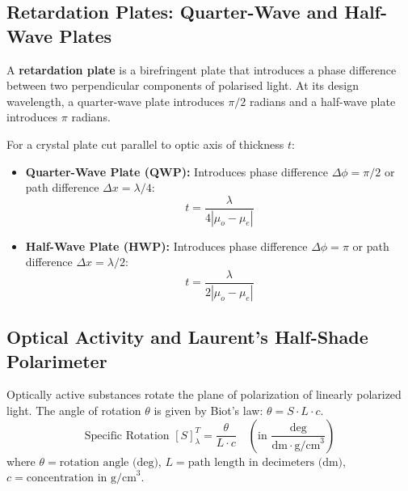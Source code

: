 \documentclass[12pt,a4paper]{article}
\begin{document}
\subsection{Retardation Plates: Quarter-Wave and Half-Wave Plates}

\begin{tcolorbox}[defbox, title={Retardation Plate}]
A \textbf{retardation plate} is a birefringent plate that introduces a phase difference between two perpendicular components of polarised light. At its design wavelength, a quarter-wave plate introduces $\pi/2$ radians and a half-wave plate introduces $\pi$ radians.
\end{tcolorbox}

\begin{tcolorbox}[formulabox, title={\textbf{Retardation Plate Thickness Equations}}]
For a crystal plate cut parallel to optic axis of thickness $t$:
\begin{itemize}[leftmargin=*, itemsep=3pt]
  \item \textbf{Quarter-Wave Plate (QWP):} Introduces phase difference $\Delta \phi = \pi/2$ or path difference $\Delta x = \lambda/4$:
  \begin{equation}
  t = \frac{\lambda}{4 |\mu_o - \mu_e|}
  \end{equation}
  \item \textbf{Half-Wave Plate (HWP):} Introduces phase difference $\Delta \phi = \pi$ or path difference $\Delta x = \lambda/2$:
  \begin{equation}
  t = \frac{\lambda}{2 |\mu_o - \mu_e|}
  \end{equation}
\end{itemize}
\end{tcolorbox}

\subsection{Optical Activity and Laurent's Half-Shade Polarimeter}

Optically active substances rotate the plane of polarization of linearly polarized light.
The angle of rotation $\theta$ is given by Biot's law: $\theta = S \cdot L \cdot c$.
\begin{equation}
\text{Specific Rotation } [S]_\lambda^T = \frac{\theta}{L \cdot c} \quad \left(\text{in } \frac{\text{deg}}{\text{dm} \cdot \text{g/cm}^3}\right)
\end{equation}
where $\theta = \text{rotation angle (deg)}$, $L = \text{path length in decimeters (dm)}$, $c = \text{concentration in g/cm}^3$.
\end{document}
